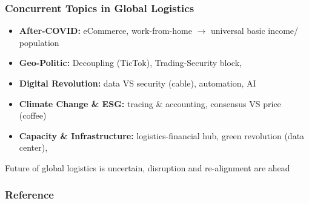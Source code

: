 \documentclass[10pt,presentation]{beamer}
\begin{document}
\begin{frame}
  \frametitle{Concurrent Topics in Global Logistics}

  \begin{itemize}
    \item \textbf{After-COVID:} eCommerce, work-from-home $\rightarrow$ universal basic income/ population
    \item \textbf{Geo-Politic:} Decoupling (TicTok), Trading-Security block,
    \item \textbf{Digital Revolution:} data VS security (cable), automation, AI
    \item \textbf{Climate Change \& ESG:} tracing \& accounting, consensus \textsc{VS} price (coffee)
    \item \textbf{Capacity \& Infrastructure:} logistics-financial hub, green revolution (data center),
  \end{itemize}

  \NextLine
  \begin{block}{}{}
    Future of global logistics is uncertain, \alert{disruption} and \alert{re-alignment} are ahead
  \end{block}


\end{frame}




\begin{frame}
  \frametitle{Reference}

  \begin{footnotesize}
    ,}
  \end{footnotesize}


\end{frame}




\end{document}
